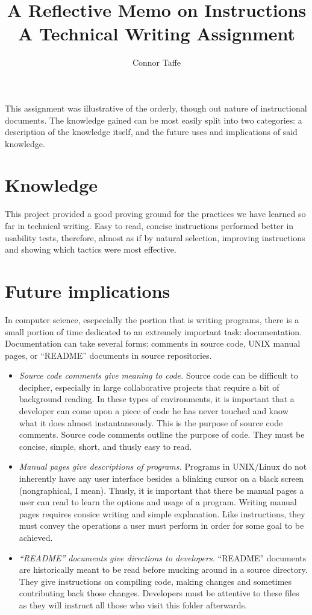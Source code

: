 \documentclass{memoir}
\title{
A Reflective Memo on Instructions
\\\vspace{2mm}
\large
A Technical Writing Assignment
}
\author{Connor Taffe}
\begin{document}
	\maketitle

This assignment was illustrative of the orderly, though out nature of instructional documents. The knowledge gained can be most easily split into two categories: a description of the knowledge itself, and the future uses and implications of said knowledge.

\section{Knowledge}

This project provided a good proving ground for the practices we have learned so far in technical writing. Easy to read, concise instructions performed better in usability tests, therefore, almost as if by natural selection, improving instructions and showing which tactics were most effective.

\section{Future implications}

In computer science, escpecially the portion that is writing programs, there is a small portion of time dedicated to an extremely important task: documentation. Documentation can take several forms: comments in source code, UNIX manual pages, or ``README'' documents in source repositories.

\begin{itemize}
	\item{
		\emph{Source code comments give meaning to code.} Source code can be difficult to decipher, especially in large collaborative projects that require a bit of background reading. In these types of environments, it is important that a developer can come upon a piece of code he has never touched and know what it does almost instantaneously. This is the purpose of source code comments. Source code comments outline the purpose of code. They must be concise, simple, short, and thusly easy to read.
	}
	\item{
		\emph{Manual pages give descriptions of programs.} Programs in UNIX/Linux do not inherently have any user interface besides a blinking cursor on a black screen (nongraphical, I mean). Thusly, it is important that there be manual pages a user can read to learn the options and usage of a program. Writing manual pages requires consice writing and simple explanation. Like instructions, they must convey the operations a user must perform in order for some goal to be achieved.
	}
	\item{
		\emph{``README'' documents give directions to developers.} ``README'' documents are historically meant to be read before mucking around in a source directory. They give instructions on compiling code, making changes and sometimes contributing back those changes. Developers must be attentive to these files as they will instruct all those who visit this folder afterwards.
	}
\end{itemize}
\end{document}

